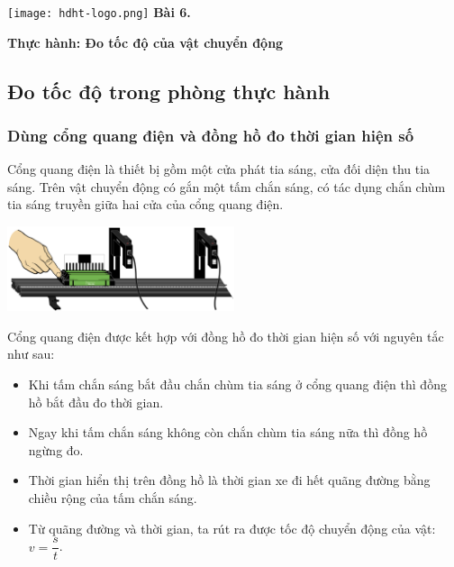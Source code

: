 \newcommand{\chapter}[2][]{
	\newcommand{\chapname}{#2}
	\begin{flushleft}
		\begin{minipage}[t]{\linewidth}
			\texttt{[image: hdht-logo.png]}
			\hspace{0pt}	
			\sffamily\bfseries\large Bài 6.
			\begin{flushleft}
				\LARGE\bfseries #1
			\end{flushleft}
		\end{minipage}
	\end{flushleft}
	\vspace{1cm}
	\normalfont\normalsize
}
\chapter[Thực hành: Đo tốc độ của vật chuyển động]{Thực hành: Đo tốc độ của vật chuyển động}

\subsection{Đo tốc độ trong phòng thực hành}
\subsubsection{Dùng cổng quang điện và đồng hồ đo thời gian hiện số}
Cổng quang điện là thiết bị gồm một cửa phát tia sáng, cửa đối diện thu tia sáng. Trên vật chuyển động có gắn một tấm chắn sáng, có tác dụng chắn chùm tia sáng truyền giữa hai cửa của cổng quang điện.
\begin{center}
	\includegraphics[width=0.5\textwidth]{../figs/G10-4-1}
\end{center}
Cổng quang điện được kết hợp với đồng hồ đo thời gian hiện số với nguyên tắc như sau:
\begin{itemize}
	\item Khi tấm chắn sáng bắt đầu chắn chùm tia sáng ở cổng quang điện thì đồng hồ bắt đầu đo thời gian.
	\item Ngay khi tấm chắn sáng không còn chắn chùm tia sáng nữa thì đồng hồ ngừng đo.
	\item Thời gian hiển thị trên đồng hồ là thời gian xe đi hết quãng đường bằng chiều rộng của tấm chắn sáng. %
	\item Từ quãng đường và thời gian, ta rút ra được tốc độ chuyển động của vật: $v = \dfrac{s}{t}$.
\end{itemize}
